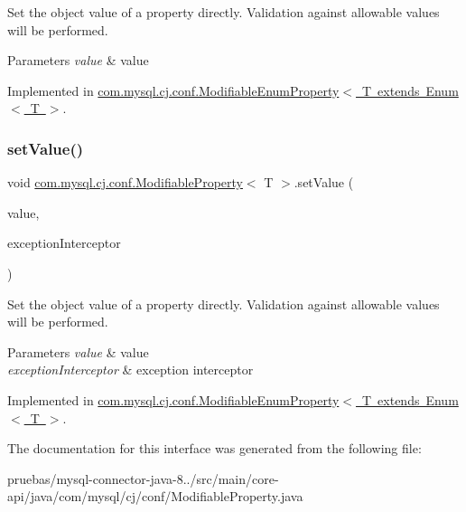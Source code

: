 Set the object value of a property directly. Validation against allowable values will be performed.


\begin{DoxyParams}{Parameters}
{\em value} & value \\
\hline
\end{DoxyParams}


Implemented in \mbox{\hyperlink{classcom_1_1mysql_1_1cj_1_1conf_1_1_modifiable_enum_property_a75933d467e8ce6bf8da46c21e3177e0f}{com.\+mysql.\+cj.\+conf.\+Modifiable\+Enum\+Property$<$ T extends Enum$<$ T $>$}}.

\mbox{\label{interfacecom_1_1mysql_1_1cj_1_1conf_1_1_modifiable_property_a26fe9373efcddc22eb1fc1234eae81ed}} 
\subsubsection{\texorpdfstring{set\+Value()}{setValue()}\hspace{0.1cm}{\footnotesize\ttfamily [2/2]}}
{\footnotesize\ttfamily void \mbox{\hyperlink{interfacecom_1_1mysql_1_1cj_1_1conf_1_1_modifiable_property}{com.\+mysql.\+cj.\+conf.\+Modifiable\+Property}}$<$ T $>$.set\+Value (\begin{DoxyParamCaption}\item[{T}]{value,  }\item[{\mbox{\hyperlink{interfacecom_1_1mysql_1_1cj_1_1exceptions_1_1_exception_interceptor}{Exception\+Interceptor}}}]{exception\+Interceptor }\end{DoxyParamCaption})}

Set the object value of a property directly. Validation against allowable values will be performed.


\begin{DoxyParams}{Parameters}
{\em value} & value \\
\hline
{\em exception\+Interceptor} & exception interceptor \\
\hline
\end{DoxyParams}


Implemented in \mbox{\hyperlink{classcom_1_1mysql_1_1cj_1_1conf_1_1_modifiable_enum_property_aeb04443d10144806024e2a28bf4942de}{com.\+mysql.\+cj.\+conf.\+Modifiable\+Enum\+Property$<$ T extends Enum$<$ T $>$}}.



The documentation for this interface was generated from the following file\+:\begin{DoxyCompactItemize}
\item 
pruebas/mysql-\/connector-\/java-\/8../src/main/core-\/api/java/com/mysql/cj/conf/Modifiable\+Property.\+java\end{DoxyCompactItemize}
